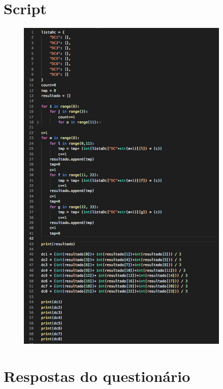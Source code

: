 \begin{apendicesenv}
\chapter{Script}

\begin{figure}[h]
	\centering
	\includegraphics[keepaspectratio=true,scale=0.9]{figuras/script.png}
	\label{script}
\end{figure}


\chapter{Respostas do questionário}
\label{respostas}


\end{apendicesenv}
